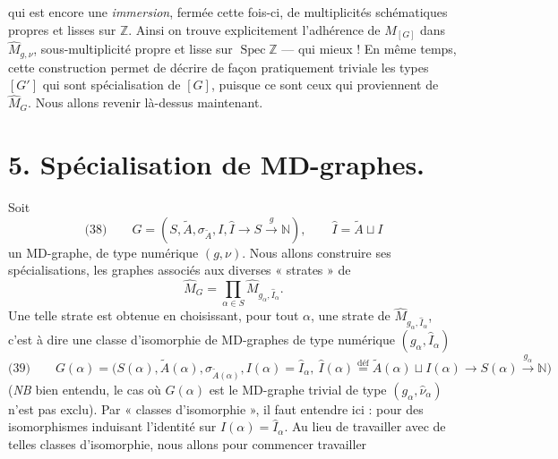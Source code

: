 \documentclass[11pt,a4paper]{article}
\begin{document}
qui est encore une \emph{immersion}, fermée cette fois-ci, de multiplicités schématiques propres et lisses sur $\mathbb{Z}$. Ainsi on trouve explicitement l'adhérence de $M_{[G]}$ dans $\hat{M}_{g,\nu}$,  sous-multiplicité propre et lisse sur $\operatorname{Spec} \mathbb{Z}$ --- qui   mieux ! En même temps, cette construction permet de décrire de façon pratiquement triviale les types $[G']$ qui sont spécialisation de $[G]$, puisque ce sont ceux qui proviennent de $\hat{M}_G$. Nous allons \struck{\ill{}} revenir là-dessus maintenant.

\section{5. Spécialisation  de MD-graphes.}

Soit
\[
\text{(38)}\qquad G = (S, \tilde{A}, \sigma_{\tilde{A}}, I, \hat{I} \to S \xrightarrow{g} \mathbb{N}), \qquad \hat{I} = \tilde{A} \sqcup I
\]
un MD-graphe, de type numérique $(g,\nu)$. Nous allons construire ses \struck{\ill{}} spécialisations,  les graphes associés aux diverses « strates » de \struck{\ill{}}
\[
\hat{M}_G = \prod_{\alpha\in S} \hat{M}_{g_\alpha, \hat{I}_\alpha} .
\]
Une telle strate est obtenue en choisissant, pour tout $\alpha$, une strate de $\hat{M}_{g_\alpha, \hat{I}_\alpha}$, c'est à dire une classe d'isomorphie de MD-graphes  de type  numérique $(g_\alpha, \hat{I}_\alpha)$
\[
\text{(39)}\qquad G(\alpha) = \bigl(S(\alpha), \tilde{A}(\alpha), \sigma_{\tilde{A}(\alpha)}, I(\alpha) = \hat{I}_\alpha, \ \hat{I}(\alpha) \overset{\text{déf}}{=} \tilde{A}(\alpha) \sqcup I(\alpha) \to S(\alpha) \xrightarrow{g_\alpha} \mathbb{N}\bigr)
\]
(\emph{NB} bien entendu, le cas où $G(\alpha)$ est le MD-graphe trivial de type $(g_\alpha, \hat{\nu}_\alpha)$ n'est pas exclu). Par « classes d'isomorphie », il faut entendre ici : pour des isomorphismes induisant l'identité sur $I(\alpha) = \hat{I}_\alpha$. Au lieu de travailler avec de telles classes d'isomorphie, nous allons pour commencer travailler
\end{document}
